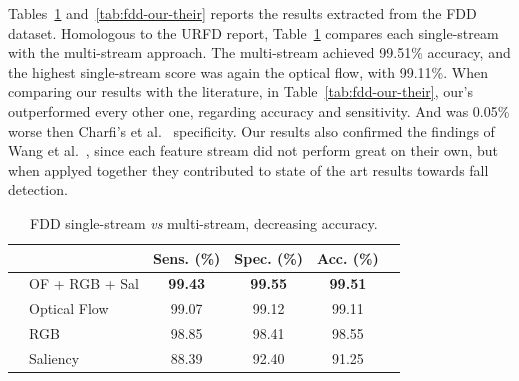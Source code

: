 \documentclass[conference]{IEEEtran}
\begin{document}
Tables~\ref{tab:fdd-ensem} and~\ref{tab:fdd-our-their} reports the results extracted from the FDD dataset. Homologous to the URFD report, Table~\ref{tab:fdd-ensem} compares each single-stream with the multi-stream approach. The multi-stream achieved 99.51\% accuracy, and the highest single-stream score was again the optical flow, with 99.11\%. When comparing our results with the literature, in Table~\ref{tab:fdd-our-their}, our's outperformed every other one, regarding accuracy and sensitivity. And was 0.05\% worse then Charfi's et al.~\cite{charfi2013optimised} specificity. Our results also confirmed the findings of Wang et al.~\cite{wang2015towards}, since each feature stream did not perform great on their own, but when applyed together they contributed to state of the art results towards fall detection.

\begin{table}[]
\centering
\caption{FDD single-stream \textit{vs} multi-stream, decreasing accuracy.}
\label{tab:fdd-ensem}
\begin{tabular}{llcccl}
\hline
 &  & Sens. (\%) & Spec. (\%) & Acc. (\%) &  \\ \hline
 & OF + RGB + Sal & \textbf{99.43} & \textbf{99.55} & \textbf{99.51} &  \\
 & Optical Flow & 99.07             & 99.12             & 99.11             &  \\
 & RGB & 98.85             & 98.41             & 98.55             &  \\
 & Saliency & 88.39             & 92.40             & 91.25             & \\ \hline
\end{tabular}
\end{table}
\end{document}
